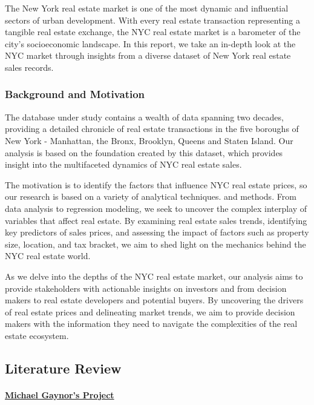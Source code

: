 \documentclass[
]{article}
\begin{document}
The New York real estate market is one of the most dynamic and
influential sectors of urban development. With every real estate
transaction representing a tangible real estate exchange, the NYC real
estate market is a barometer of the city's socioeconomic landscape. In
this report, we take an in-depth look at the NYC market through insights
from a diverse dataset of New York real estate sales records.

\hypertarget{background-and-motivation}{%
\subsubsection{Background and
Motivation}\label{background-and-motivation}}

The database under study contains a wealth of data spanning two decades,
providing a detailed chronicle of real estate transactions in the five
boroughs of New York - Manhattan, the Bronx, Brooklyn, Queens and Staten
Island. Our analysis is based on the foundation created by this dataset,
which provides insight into the multifaceted dynamics of NYC real estate
sales.

The motivation is to identify the factors that influence NYC real estate
prices, so our research is based on a variety of analytical techniques.
and methods. From data analysis to regression modeling, we seek to
uncover the complex interplay of variables that affect real estate. By
examining real estate sales trends, identifying key predictors of sales
prices, and assessing the impact of factors such as property size,
location, and tax bracket, we aim to shed light on the mechanics behind
the NYC real estate world.

As we delve into the depths of the NYC real estate market, our analysis
aims to provide stakeholders with actionable insights on investors and
from decision makers to real estate developers and potential buyers. By
uncovering the drivers of real estate prices and delineating market
trends, we aim to provide decision makers with the information they need
to navigate the complexities of the real estate ecosystem.

\hypertarget{literature-review}{%
\subsection{Literature Review}\label{literature-review}}

\hypertarget{michael-gaynors-project}{%
\paragraph{\texorpdfstring{\href{https://medium.com/@mgaynor228/analysis-of-nyc-property-sales-9af7686aa2ca}{Michael
Gaynor's
Project}}{Michael Gaynor's Project}}\label{michael-gaynors-project}}
\end{document}
